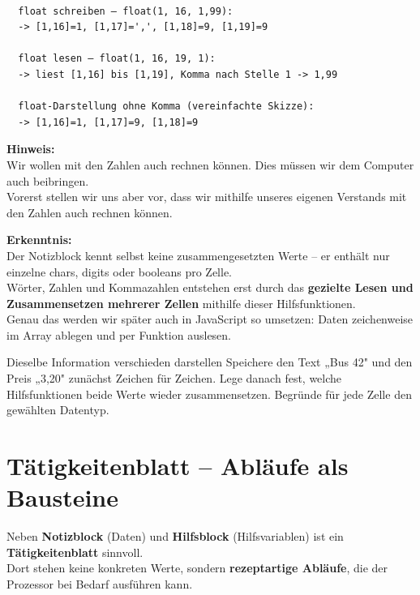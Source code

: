 \documentclass{article}
\begin{document}
\begin{itemize}
          \begin{verbatim}

  float schreiben – float(1, 16, 1,99):
  -> [1,16]=1, [1,17]=',', [1,18]=9, [1,19]=9

  float lesen – float(1, 16, 19, 1):
  -> liest [1,16] bis [1,19], Komma nach Stelle 1 -> 1,99

  float-Darstellung ohne Komma (vereinfachte Skizze):
  -> [1,16]=1, [1,17]=9, [1,18]=9
          \end{verbatim}

        \end{itemize}


\textbf{Hinweis:}\\
        Wir wollen mit den Zahlen auch rechnen können. Dies müssen wir dem Computer auch beibringen.\\
        Vorerst stellen wir uns aber vor, dass wir mithilfe unseres eigenen Verstands mit den Zahlen auch rechnen können.
        
        	\textbf{Erkenntnis:}\\
          Der Notizblock kennt selbst keine zusammengesetzten Werte – er enthält nur einzelne chars, digits oder booleans pro Zelle.\\
          Wörter, Zahlen und Kommazahlen entstehen erst durch das \textbf{gezielte Lesen und Zusammensetzen mehrerer Zellen} mithilfe dieser Hilfsfunktionen.\\
          Genau das werden wir später auch in JavaScript so umsetzen: Daten zeichenweise im Array ablegen und per Funktion auslesen.

\begin{uebung}{Dieselbe Information verschieden darstellen}
Speichere den Text „Bus 42" und den Preis „3,20" zunächst Zeichen für Zeichen. Lege danach fest, welche Hilfsfunktionen beide Werte wieder zusammensetzen. Begründe für jede Zelle den gewählten Datentyp.
\end{uebung}


      
    

    
      
        \section{Tätigkeitenblatt – Abläufe als Bausteine}
        
Neben \textbf{Notizblock} (Daten) und \textbf{Hilfsblock} (Hilfsvariablen) ist ein \textbf{Tätigkeitenblatt} sinnvoll.\\
          Dort stehen keine konkreten Werte, sondern \textbf{rezeptartige Abläufe}, die der Prozessor bei Bedarf ausführen kann.
\end{document}
